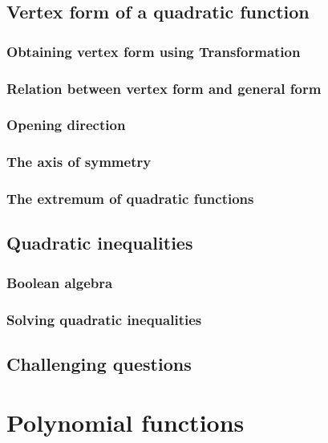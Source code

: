 \documentclass[12pt]{article}
\begin{document}
    \subsection{Vertex form of a quadratic function}

    \subsubsection*{Obtaining vertex form using Transformation}

    \subsubsection*{Relation between vertex form and general form}

    \subsubsection*{Opening direction}

    \subsubsection*{The axis of symmetry}

    \subsubsection*{The extremum of quadratic functions}

    \subsection{Quadratic inequalities}

    \subsubsection*{Boolean algebra}

    \subsubsection*{Solving quadratic inequalities}

    \subsection{Challenging questions}

    \newpage 

    \section{Polynomial functions}
\end{document}
